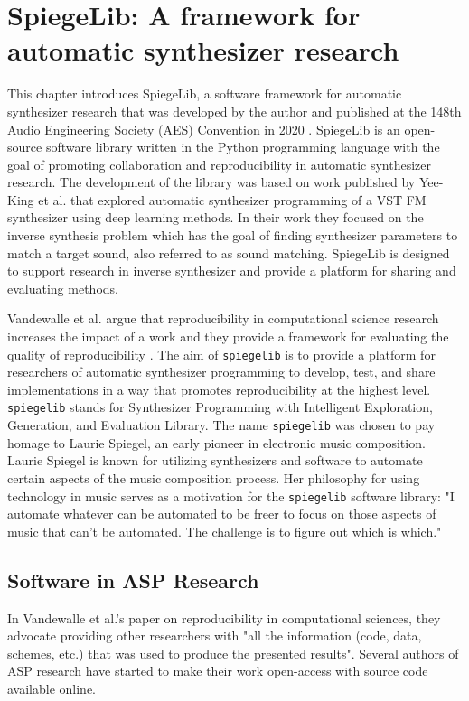 \graphicspath{{./}{./figures/}{./figures/spiegelib/}}

\chapter{SpiegeLib: A framework for automatic synthesizer research}
\label{chapter:spiegelib}

This chapter introduces SpiegeLib, a software framework for automatic synthesizer research that was developed by the author and published at the 148th Audio Engineering Society (AES) Convention in 2020 \cite{shier2020spiegelib}. SpiegeLib is an open-source software library written in the Python programming language with the goal of promoting collaboration and reproducibility in automatic synthesizer research. The development of the library was based on work published by Yee-King et al. \cite{yee2018automatic} that explored automatic synthesizer programming of a VST FM synthesizer using deep learning methods. In their work they focused on the inverse synthesis problem which has the goal of finding synthesizer parameters to match a target sound, also referred to as sound matching. SpiegeLib is designed to support research in inverse synthesizer and provide a platform for sharing and evaluating methods.

Vandewalle et al. argue that reproducibility in computational science research increases the impact of a work and they provide a framework for evaluating the quality of reproducibility \cite{vandewalle2009reproducible}. The aim of \texttt{spiegelib} is to provide a platform for researchers of automatic synthesizer programming to develop, test, and share implementations in a way that promotes reproducibility at the highest level. \texttt{spiegelib} stands for Synthesizer Programming with Intelligent Exploration, Generation, and Evaluation Library. The name \texttt{spiegelib} was chosen to pay homage to Laurie Spiegel, an early pioneer in electronic music composition. Laurie Spiegel is known for utilizing synthesizers and software to automate certain aspects of the music composition process. Her philosophy for using technology in music serves as a motivation for the \texttt{spiegelib} software library: "I automate whatever can be automated to be freer to focus on those aspects of music that can't be automated. The challenge is to figure out which is which." \cite{hinkle2006women}

\section{Software in ASP Research}
 In Vandewalle et al.'s paper on reproducibility in computational sciences, they advocate providing other researchers with "all the information (code, data, schemes, etc.) that was used to produce the presented results"\cite{vandewalle2009reproducible}. Several authors of ASP research have started to make their work open-access with source code available online. 
 
